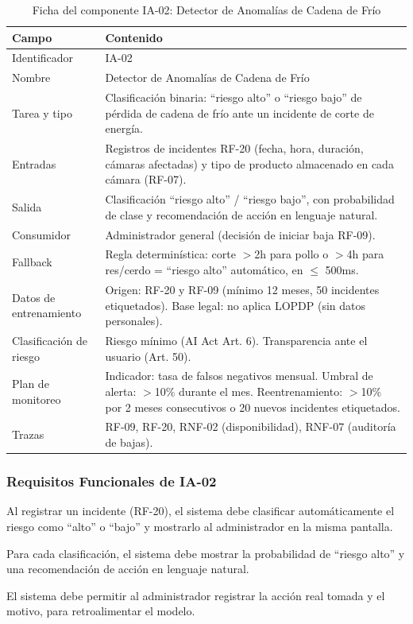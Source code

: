 \documentclass[11pt,a4paper]{article}
\begin{document}
\begin{longtable}{|p{3cm}|p{11cm}|}
\caption{Ficha del componente IA-02: Detector de Anomalías de Cadena de Frío}\\
\hline
\textbf{Campo} & \textbf{Contenido} \\
\hline
Identificador & IA-02 \\
\hline
Nombre & Detector de Anomalías de Cadena de Frío \\
\hline
Tarea y tipo & Clasificación binaria: ``riesgo alto'' o ``riesgo bajo'' de pérdida de cadena de frío ante un incidente de corte de energía. \\
\hline
Entradas & Registros de incidentes RF-20 (fecha, hora, duración, cámaras afectadas) y tipo de producto almacenado en cada cámara (RF-07). \\
\hline
Salida & Clasificación ``riesgo alto'' / ``riesgo bajo'', con probabilidad de clase y recomendación de acción en lenguaje natural. \\
\hline
Consumidor & Administrador general (decisión de iniciar baja RF-09). \\
\hline
Fallback & Regla determinística: corte $>$2h para pollo o $>$4h para res/cerdo = ``riesgo alto'' automático, en $\leq$ 500ms. \\
\hline
Datos de entrenamiento & Origen: RF-20 y RF-09 (mínimo 12 meses, 50 incidentes etiquetados). Base legal: no aplica LOPDP (sin datos personales). \\
\hline
Clasificación de riesgo & Riesgo mínimo (AI Act Art. 6). Transparencia ante el usuario (Art. 50). \\
\hline
Plan de monitoreo & Indicador: tasa de falsos negativos mensual. Umbral de alerta: $>$10\% durante el mes. Reentrenamiento: $>$10\% por 2 meses consecutivos o 20 nuevos incidentes etiquetados. \\
\hline
Trazas & RF-09, RF-20, RNF-02 (disponibilidad), RNF-07 (auditoría de bajas). \\
\hline
\end{longtable}

\subsubsection{Requisitos Funcionales de IA-02}

\begin{description}[nosep]
\item[RF-IA-04.] Al registrar un incidente (RF-20), el sistema debe clasificar automáticamente el riesgo como ``alto'' o ``bajo'' y mostrarlo al administrador en la misma pantalla.
\item[RF-IA-05.] Para cada clasificación, el sistema debe mostrar la probabilidad de ``riesgo alto'' y una recomendación de acción en lenguaje natural.
\item[RF-IA-06.] El sistema debe permitir al administrador registrar la acción real tomada y el motivo, para retroalimentar el modelo.
\end{description}
\end{document}
